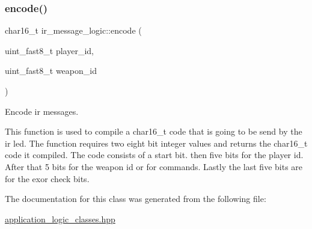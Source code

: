 \subsubsection{\texorpdfstring{encode()}{encode()}}
{\footnotesize\ttfamily char16\+\_\+t ir\+\_\+message\+\_\+logic\+::encode (\begin{DoxyParamCaption}\item[{uint\+\_\+fast8\+\_\+t}]{player\+\_\+id,  }\item[{uint\+\_\+fast8\+\_\+t}]{weapon\+\_\+id }\end{DoxyParamCaption})\hspace{0.3cm}{\ttfamily [inline]}}



Encode ir messages. 

This function is used to compile a char16\+\_\+t code that is going to be send by the ir led. The function requires two eight bit integer values and returns the char16\+\_\+t code it compiled. The code consists of a start bit. then five bits for the player id. After that 5 bits for the weapon id or for commands. Lastly the last five bits are for the exor check bits. 

The documentation for this class was generated from the following file\+:\begin{DoxyCompactItemize}
\item 
\hyperlink{application__logic__classes_8hpp}{application\+\_\+logic\+\_\+classes.\+hpp}\end{DoxyCompactItemize}

